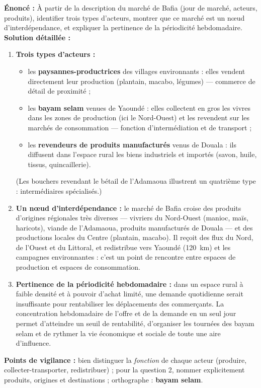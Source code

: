 \documentclass[11pt]{article}
\begin{document}
\begin{corrige}
\textbf{Énoncé :} À partir de la description du marché de Bafia (jour de marché, acteurs, produits), identifier trois types d'acteurs, montrer que ce marché est un nœud d'interdépendance, et expliquer la pertinence de la périodicité hebdomadaire.
\tcblower
\textbf{Solution détaillée :}
\begin{enumerate}
    \item \textbf{Trois types d'acteurs :}
    \begin{itemize}
        \item les \textbf{paysannes-productrices} des villages environnants : elles vendent directement leur production (plantain, macabo, légumes) — commerce de détail de proximité ;
        \item les \textbf{bayam selam} venues de Yaoundé : elles collectent en gros les vivres dans les zones de production (ici le Nord-Ouest) et les revendent sur les marchés de consommation — fonction d'intermédiation et de transport ;
        \item les \textbf{revendeurs de produits manufacturés} venus de Douala : ils diffusent dans l'espace rural les biens industriels et importés (savon, huile, tissus, quincaillerie).
    \end{itemize}
    (Les bouchers revendant le bétail de l'Adamaoua illustrent un quatrième type : intermédiaires spécialisés.)

    \item \textbf{Un nœud d'interdépendance :} le marché de Bafia croise des produits d'origines régionales très diverses — vivriers du Nord-Ouest (manioc, maïs, haricots), viande de l'Adamaoua, produits manufacturés de Douala — et des productions locales du Centre (plantain, macabo). Il reçoit des flux du Nord, de l'Ouest et du Littoral, et redistribue vers Yaoundé (120~km) et les campagnes environnantes : c'est un point de rencontre entre espaces de production et espaces de consommation.

    \item \textbf{Pertinence de la périodicité hebdomadaire :} dans un espace rural à faible densité et à pouvoir d'achat limité, une demande quotidienne serait insuffisante pour rentabiliser les déplacements des commerçants. La concentration hebdomadaire de l'offre et de la demande en un seul jour permet d'atteindre un seuil de rentabilité, d'organiser les tournées des bayam selam et de rythmer la vie économique et sociale de toute une aire d'influence.
\end{enumerate}

\textbf{Points de vigilance :} bien distinguer la \emph{fonction} de chaque acteur (produire, collecter-transporter, redistribuer) ; pour la question 2, nommer explicitement produits, origines et destinations ; orthographe : \textbf{bayam selam}.
\end{corrige}
\end{document}
